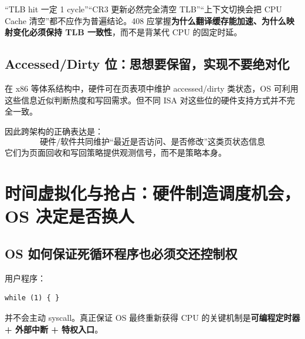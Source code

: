 \documentclass[11pt,a4paper]{ctexart}
\newcommand{\kw}[1]{\textbf{#1}}
\begin{document}
\begin{warn}[边界修正]
“TLB hit 一定 1 cycle”“CR3 更新必然完全清空 TLB”“上下文切换会把 CPU Cache 清空”都不应作为普遍结论。408 应掌握\kw{为什么翻译缓存能加速、为什么映射变化必须保持 TLB 一致性}，而不是背某代 CPU 的固定时延。
\end{warn}

\subsection{Accessed/Dirty 位：思想要保留，实现不要绝对化}
在 x86 等体系结构中，硬件可在页表项中维护 accessed/dirty 类状态，OS 可利用这些信息近似判断热度和写回需求。但不同 ISA 对这些位的硬件支持方式并不完全一致。

因此跨架构的正确表达是：
\[
\boxed{\text{硬件/软件共同维护“最近是否访问、是否修改”这类页状态信息}}
\]
它们为页面回收和写回策略提供观测信号，而不是策略本身。

\section{时间虚拟化与抢占：硬件制造调度机会，OS 决定是否换人}

\subsection{OS 如何保证死循环程序也必须交还控制权}
用户程序：
\begin{verbatim}
while (1) { }
\end{verbatim}
并不会主动 syscall。真正保证 OS 最终重新获得 CPU 的关键机制是\kw{可编程定时器 + 外部中断 + 特权入口}。

\begin{center}
\end{center}
\end{document}
